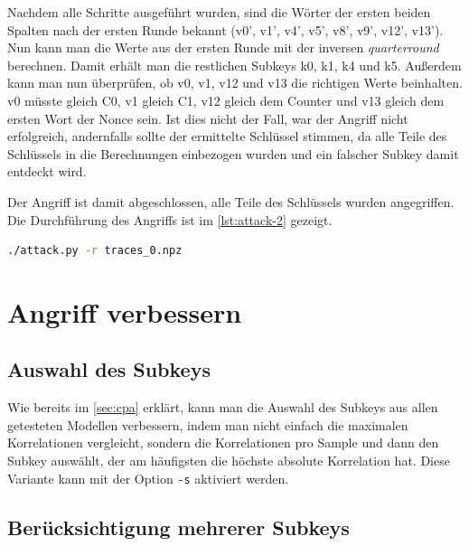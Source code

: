 \documentclass[a4paper,ngerman]{scrreprt}
\begin{document}
\medskip

Nachdem alle Schritte ausgeführt wurden, sind die Wörter der ersten beiden
Spalten nach der ersten Runde bekannt (v0', v1', v4', v5', v8', v9', v12',
v13'). Nun kann man die Werte aus der ersten Runde mit der inversen
\emph{quarterround} berechnen. Damit erhält man die restlichen Subkeys k0, k1,
k4 und k5. Außerdem kann man nun überprüfen, ob v0, v1, v12 und v13 die
richtigen Werte beinhalten. v0 müsste gleich C0, v1 gleich C1, v12 gleich dem
Counter und v13 gleich dem ersten Wort der Nonce sein. Ist dies nicht der Fall,
war der Angriff nicht erfolgreich, andernfalls sollte der ermittelte Schlüssel
stimmen, da alle Teile des Schlüssels in die Berechnungen einbezogen wurden und
ein falscher Subkey damit entdeckt wird.

Der Angriff ist damit abgeschlossen, alle Teile des Schlüssels wurden
angegriffen. Die Durchführung des Angriffs ist im \autoref{lst:attack-2}
gezeigt.

\begin{lstlisting}[language=bash, caption={Angriff, Variante 2}, label=lst:attack-2]
./attack.py -r traces_0.npz
\end{lstlisting}


\section{Angriff verbessern}

\subsection{Auswahl des Subkeys}

Wie bereits im \autoref{sec:cpa} erklärt, kann man die Auswahl des Subkeys aus
allen getesteten Modellen verbessern, indem man nicht einfach die maximalen
Korrelationen vergleicht, sondern die Korrelationen pro Sample und dann den
Subkey auswählt, der am häufigsten die höchste absolute Korrelation hat. Diese
Variante kann mit der Option \verb+-s+ aktiviert werden.


\subsection{Berücksichtigung mehrerer Subkeys}
\end{document}
